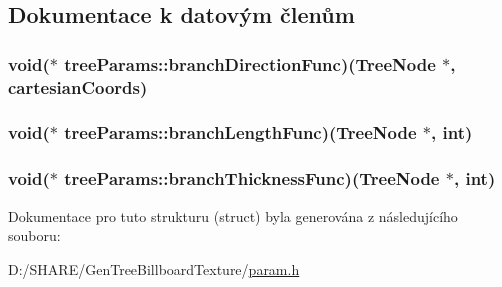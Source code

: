 \subsection{Dokumentace k datovým členům}
\hypertarget{structtree_params_ad23e490eec602e6b1f9bf883a1eed1f4}{
\subsubsection[{branchDirectionFunc}]{\setlength{\rightskip}{0pt plus 5cm}void($\ast$ {\bf treeParams::branchDirectionFunc})({\bf TreeNode} $\ast$, {\bf cartesianCoords})}}
\label{structtree_params_ad23e490eec602e6b1f9bf883a1eed1f4}
\hypertarget{structtree_params_a57a7108e06e4882c73abcad9c704edcf}{
\subsubsection[{branchLengthFunc}]{\setlength{\rightskip}{0pt plus 5cm}void($\ast$ {\bf treeParams::branchLengthFunc})({\bf TreeNode} $\ast$, int)}}
\label{structtree_params_a57a7108e06e4882c73abcad9c704edcf}
\hypertarget{structtree_params_a4e0c469f7d593e2ef180342e65a91e0c}{
\subsubsection[{branchThicknessFunc}]{\setlength{\rightskip}{0pt plus 5cm}void($\ast$ {\bf treeParams::branchThicknessFunc})({\bf TreeNode} $\ast$, int)}}
\label{structtree_params_a4e0c469f7d593e2ef180342e65a91e0c}


Dokumentace pro tuto strukturu (struct) byla generována z následujícího souboru:\begin{DoxyCompactItemize}
\item 
D:/SHARE/GenTreeBillboardTexture/\hyperlink{param_8h}{param.h}\end{DoxyCompactItemize}
